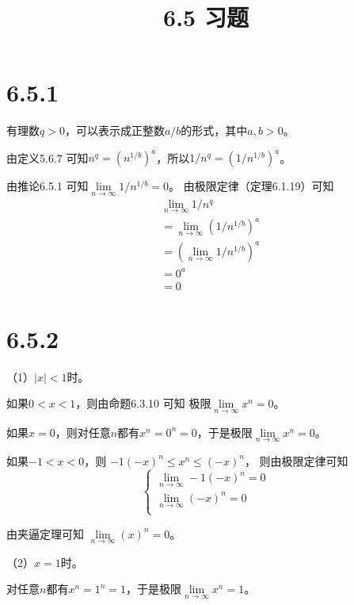 \documentclass{article}
\theoremstyle{mystyle}
\begin{document}
\title{6.5 习题}
\maketitle

\section*{6.5.1}

有理数$q > 0$，可以表示成正整数$a/b$的形式，其中$a,b > 0$。

由定义5.6.7 可知$n^q = (n^{1/b})^a$，所以$1/n^q = (1/n^{1/b})^a$。

由推论6.5.1 可知$\lim\limits_{n \rightarrow \infty}1/n^{1/b} = 0$。
由极限定律（定理6.1.19）可知
\begin{align*}
   & \lim\limits_{n \rightarrow \infty}1/n^q           \\
   & =\lim\limits_{n \rightarrow \infty}(1/n^{1/b})^a  \\
   & = (\lim\limits_{n \rightarrow \infty}1/n^{1/b})^a \\
   & = 0^a                                             \\
   & = 0
\end{align*}

\section*{6.5.2}

（1）$|x|<1$时。

如果$0 < x < 1$，则由命题6.3.10 可知 极限$\lim\limits_{n \rightarrow \infty}x^n = 0$。

如果$x=0$，则对任意$n$都有$x^n = 0^n = 0$，于是极限$\lim\limits_{n \rightarrow \infty}x^n = 0$。

如果$-1 < x < 0$，则 $-1(-x)^n \leq x^n \leq (-x)^n$， 则由极限定律可知
\begin{equation*}
  \begin{cases*}
    \lim\limits_{n \rightarrow \infty}-1(-x)^n = 0 \\
    \lim\limits_{n \rightarrow \infty}(-x)^n = 0   \\
  \end{cases*}
\end{equation*}

由夹逼定理可知 $\lim\limits_{n \rightarrow \infty}(x)^n = 0$。

（2）$x = 1$时。

对任意$n$都有$x^n = 1^n = 1$，于是极限$\lim\limits_{n \rightarrow \infty}x^n = 1$。
\end{document}
